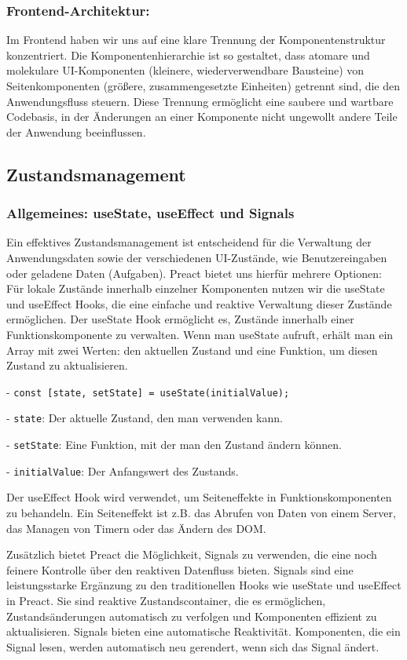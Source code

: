 \documentclass[12pt,a4paper]{scrartcl} %
\begin{document}
\subsubsection{Frontend-Architektur:} 

Im Frontend haben wir uns auf eine klare Trennung der Komponentenstruktur konzentriert. Die Komponentenhierarchie ist so gestaltet, dass atomare und molekulare UI-Komponenten (kleinere, wiederverwendbare Bausteine) von Seitenkomponenten (größere, zusammengesetzte Einheiten) getrennt sind, die den Anwendungsfluss steuern. Diese Trennung ermöglicht eine saubere und wartbare Codebasis, in der Änderungen an einer Komponente nicht ungewollt andere Teile der Anwendung beeinflussen.

\subsection{Zustandsmanagement}

\subsubsection{Allgemeines: useState, useEffect und Signals}

Ein effektives Zustandsmanagement ist entscheidend für die Verwaltung der Anwendungsdaten sowie der verschiedenen UI-Zustände, wie Benutzereingaben oder geladene Daten (Aufgaben). Preact bietet uns hierfür mehrere Optionen: Für lokale Zustände innerhalb einzelner Komponenten nutzen wir die useState und useEffect Hooks, die eine einfache und reaktive Verwaltung dieser Zustände ermöglichen. 
Der useState Hook ermöglicht es, Zustände innerhalb einer Funktionskomponente zu verwalten. Wenn man useState aufruft, erhält man ein Array mit zwei Werten: den aktuellen Zustand und eine Funktion, um diesen Zustand zu aktualisieren.

- \texttt{const [state, setState] = useState(initialValue);}

- \texttt{state}: Der aktuelle Zustand, den man verwenden kann.

- \texttt{setState}: Eine Funktion, mit der man den Zustand ändern können.

- \texttt{initialValue}: Der Anfangswert des Zustands.

Der useEffect Hook wird verwendet, um Seiteneffekte in Funktionskomponenten zu behandeln. Ein Seiteneffekt ist z.B. das Abrufen von Daten von einem Server, das Managen von Timern oder das Ändern des DOM.

Zusätzlich bietet Preact die Möglichkeit, Signals zu verwenden, die eine noch feinere Kontrolle über den reaktiven Datenfluss bieten.
Signals sind eine leistungsstarke Ergänzung zu den traditionellen Hooks wie useState und useEffect in Preact. Sie sind reaktive Zustandscontainer, die es ermöglichen, Zustandsänderungen automatisch zu verfolgen und Komponenten effizient zu aktualisieren. Signals bieten eine automatische Reaktivität. Komponenten, die ein Signal lesen, werden automatisch neu gerendert, wenn sich das Signal ändert.
\end{document}
